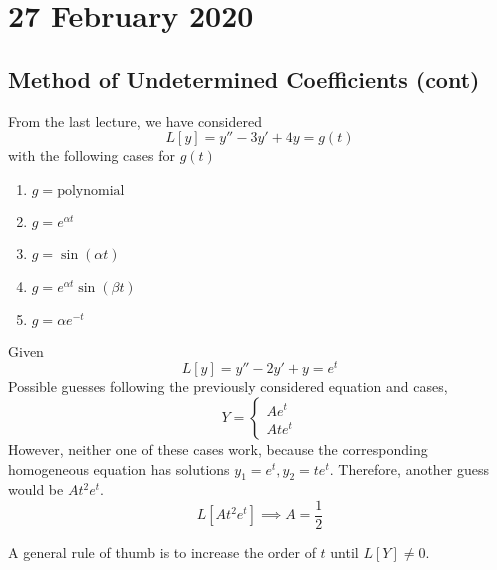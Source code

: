 \documentclass[diffeq.tex]{subfiles}
\begin{document}
\chapter{27 February 2020}
    \section{Method of Undetermined Coefficients (cont)}
    From the last lecture, we have considered
    \begin{equation}
        L[y] = y'' - 3y' + 4y = g(t)
    \end{equation}
    with the following cases for $g(t)$
    \begin{multicols}{3}
        \begin{enumerate}
            \item $g = \text{polynomial}$
            \item $g = e^{\alpha t}$
            \item $g = \sin(\alpha t)$
            \item $g = e^{\alpha t}\sin(\beta t)$
            \item $g = \alpha e^{-t}$
        \end{enumerate}
    \end{multicols}
    \begin{example}
        Given
        \begin{equation}
            L[y] = y'' -2y' + y = e^{t}
        \end{equation}
        Possible guesses following the previously considered equation and cases,
        \begin{equation}
            Y = \begin{cases}
                Ae^{t}\\
                Ate^{t}
            \end{cases}
        \end{equation}
        However, neither one of these cases work, because the corresponding homogeneous equation has solutions $y_{1} = e^{t}, y_{2} = te^{t}$. Therefore, another guess would be $At^{2}e^{t}$.
        \begin{equation}
            L[At^{2}e^{t}] \implies A = \frac{1}{2}
        \end{equation}
    \end{example}
    A general rule of thumb is to increase the order of $t$ until $L[Y] \neq 0$.
    \np
\end{document}

